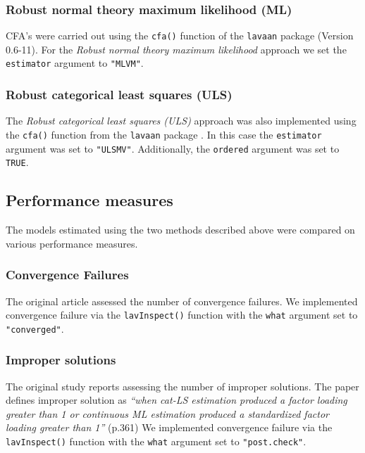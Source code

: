 \documentclass[10,a4paperpaper,]{article}
\begin{document}
\subsubsection{Robust normal theory maximum likelihood (ML)}

CFA's were carried out using the \texttt{cfa()} function of the
\texttt{lavaan} package (Version 0.6-11). For the \emph{Robust normal
theory maximum likelihood} approach we set the \texttt{estimator}
argument to \texttt{"MLVM"}.

\subsubsection{Robust categorical least squares (ULS)}

The \emph{Robust categorical least squares (ULS)} approach was also
implemented using the \texttt{cfa()} function from the \texttt{lavaan}
package . In this case the \texttt{estimator} argument was set to
\texttt{"ULSMV"}. Additionally, the \texttt{ordered} argument was set to
\texttt{TRUE}.

\subsection{Performance measures}

The models estimated using the two methods described above were compared
on various performance measures.

\subsubsection{Convergence Failures}

The original article assessed the number of convergence failures. We
implemented convergence failure via the \texttt{lavInspect()} function
with the \texttt{what} argument set to \texttt{"converged"}.

\subsubsection{Improper solutions}

The original study reports assessing the number of improper solutions.
The paper defines improper solution as \emph{``when cat-LS estimation
produced a factor loading greater than 1 or continuous ML estimation
produced a standardized factor loading greater than 1''} (p.361) We
implemented convergence failure via the \texttt{lavInspect()} function
with the \texttt{what} argument set to \texttt{"post.check"}.
\end{document}
